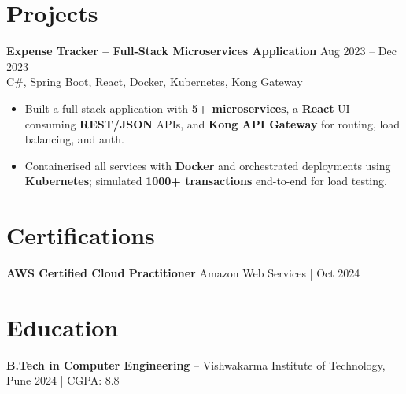 \documentclass[10pt,letterpaper]{article}
\newcommand{\resumeSubheading}[4]{%
  \textbf{#1} \hfill #2 \\
  #3 \hfill #4 \\
}
\begin{document}
\section*{Projects}
\resumeSubheading{Expense Tracker -- Full-Stack Microservices Application}{Aug 2023 -- Dec 2023}{}{C\#, Spring Boot, React, Docker, Kubernetes, Kong Gateway}
\begin{itemize}
    \item Built a full-stack application with \textbf{5+ microservices}, a \textbf{React} UI consuming \textbf{REST/JSON} APIs, and \textbf{Kong API Gateway} for routing, load balancing, and auth.
    \item Containerised all services with \textbf{Docker} and orchestrated deployments using \textbf{Kubernetes}; simulated \textbf{1000+ transactions} end-to-end for load testing.
\end{itemize}

\section*{Certifications}
\textbf{AWS Certified Cloud Practitioner} \hfill Amazon Web Services \;|\; Oct 2024

\section*{Education}
\textbf{B.Tech in Computer Engineering} -- Vishwakarma Institute of Technology, Pune \hfill 2024 \;|\; CGPA: 8.8
\end{document}
